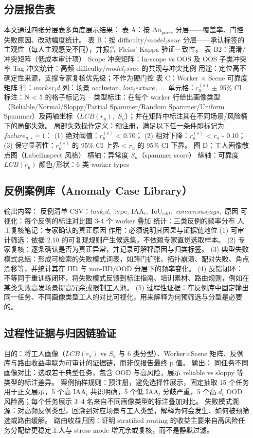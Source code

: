 \documentclass[journal,onecolumn]{IEEEtran}
\begin{document}
\subsection{分层报告表}

本文通过四张分层表多角度展示结果：
表 A：按 Δ$n_{pairs}$ 分层——覆盖率、门控失败原因、改动幅度统计。
表 B：按 difficulty/$model_issue$ 分层——承认标签的主观性（每人主观感受不同），并报告 Fleiss' Kappa 验证一致性。
表 B2：混淆/冲突矩阵（低成本审计项）
Scope 冲突矩阵：In-scope vs OOS 及 OOS 子类冲突率
Tag 冲突统计：高频 difficulty/$model_issue$ 的共现与冲突比例
用途：定位高不确定性来源，支撑专家复核优先级；不作为硬门控
表 C：Worker $\times$ Scene 可靠度矩阵
行：$worker_id$
列：场景 occlusion, $low_texture,$ ...
单元格：$r_{u}^{(s)}$ $\pm$ 95\% CI
标注：N < 5 的格子标记为 --
类型标注：在每个 worker 行给出画像类型（Reliable/Normal/Sloppy/Partial Spammer/Random Spammer/Uniform Spammer）及两轴坐标（$LCB(r_u),$ $S_u$）；并在矩阵中标注其在不同场景/风险桶下的局部失效。
局部失效操作定义：预注册，满足以下任一条件即标记为 $failure_{u,s}=1$：
(1) 绝对阈值：$r_{u}^{(s)}$ < 0.70；
(2) 相对下降：$r_{u}^{(s)}$ < $r_{u}$ - 0.10；
(3) 保守显著性：$r_{u}^{(s)}$ 的 95\% CI 上界 < $r_{u}$ 的 95\% CI 下界。
图 D：工人画像散点图（LabelInspect 风格）
横轴：异常度 $S_u$（spammer score）
纵轴：可靠度 $LCB(r_u)$
颜色/形状：6 类 worker types
\subsection{反例案例库（Anomaly Case Library）}
输出内容：
反例清单 CSV：$task_id,$ type, $\mathrm{IAA}_{t},$ $\mathrm{IoU}_{edit},$ $consensus_tags,$ 原因
可视化：每个反例的标注对比图 3-4 个 worker 叠加
统计：三类反例的频率分布
人工复核笔记：专家确认的真正原因
作用：必须说明其因果与证据链地位
(1) 可审计筛选：依据 2.10 的可复现规则产生候选集，不依赖专家直觉选取样本。
(2) 专家复核：逐条确认是否为真正异常，并记录可解释原因与归类标签。
(3) 典型失败模式总结：形成可检索的失败模式词表，如跨门扩张、拓扑崩溃、配对失败、角点漂移等，并统计其在 IID 与 non-IID/OOD 分层下的频率变化。
(4) 反馈闭环：不等同于重训练闭环，将失败模式反馈到标注指南、培训素材、路由规则，例如在某类失败高发场景提高冗余或限制工人池。
(5) 过程性证据：在反例库中固定输出同一任务、不同画像类型工人的对比可视化，用来解释为何预筛选与分型是必要的。

\subsection{过程性证据与归因链验证}
目的：将工人画像（$LCB(r_u)$ vs $S_u$ 与 6 类分型）、Worker×Scene 矩阵、反例库与路由收益串联为可审计的证据链，而非仅报告最终 p 值。
输出：
同任务不同画像对比：选取若干典型任务，包含 OOD 与高风险，展示 reliable vs sloppy 等类型的标注差异。
案例抽样规则：预注册，避免选择性展示，固定抽取 15 个任务用于正文展示，5 个高 $\mathrm{IAA}_{t}$ 共识明确，5 个低 $\mathrm{IAA}_{t}$ 分歧严重，5 个高 $d_{t}$ OOD 风险高；每个任务展示 3–4 名来自不同画像类型的标注叠加对比。
失败模式溯源：对高频反例类型，回溯到对应场景与工人类型，解释为何会发生、如何被预筛选或路由缓解。
路由收益归因：证明 stratified routing 的收益主要来自高风险任务分配给更稳定工人与 stress mode 增冗余或复核，而不是静默过滤。
\end{document}
